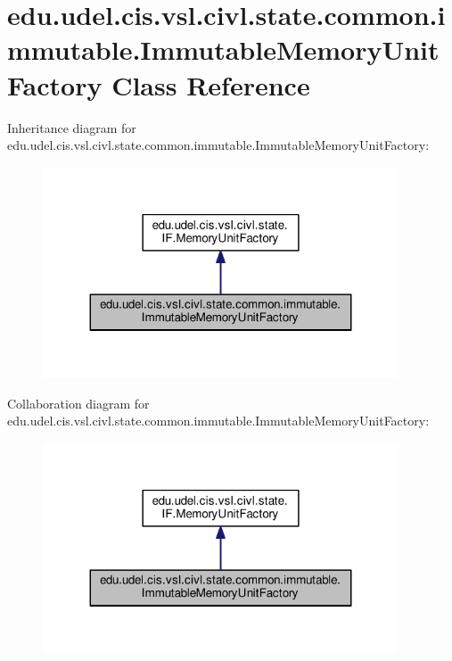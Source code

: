 \hypertarget{classedu_1_1udel_1_1cis_1_1vsl_1_1civl_1_1state_1_1common_1_1immutable_1_1ImmutableMemoryUnitFactory}{}\section{edu.\+udel.\+cis.\+vsl.\+civl.\+state.\+common.\+immutable.\+Immutable\+Memory\+Unit\+Factory Class Reference}
\label{classedu_1_1udel_1_1cis_1_1vsl_1_1civl_1_1state_1_1common_1_1immutable_1_1ImmutableMemoryUnitFactory}


Inheritance diagram for edu.\+udel.\+cis.\+vsl.\+civl.\+state.\+common.\+immutable.\+Immutable\+Memory\+Unit\+Factory\+:
\nopagebreak
\begin{figure}[H]
\begin{center}
\leavevmode
\includegraphics[width=299pt]{classedu_1_1udel_1_1cis_1_1vsl_1_1civl_1_1state_1_1common_1_1immutable_1_1ImmutableMemoryUnitFactory__inherit__graph}
\end{center}
\end{figure}


Collaboration diagram for edu.\+udel.\+cis.\+vsl.\+civl.\+state.\+common.\+immutable.\+Immutable\+Memory\+Unit\+Factory\+:
\nopagebreak
\begin{figure}[H]
\begin{center}
\leavevmode
\includegraphics[width=299pt]{classedu_1_1udel_1_1cis_1_1vsl_1_1civl_1_1state_1_1common_1_1immutable_1_1ImmutableMemoryUnitFactory__coll__graph}
\end{center}
\end{figure}

